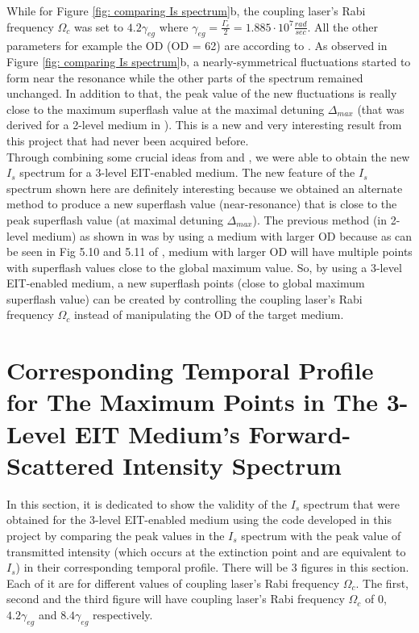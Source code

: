 While for Figure \ref{fig: comparing Is spectrum}b, the coupling laser's Rabi frequency $\Omega_{c}$ was set to $4.2\gamma_{eg}$ where $\gamma_{eg} = \frac{\Gamma_{e}}{2} = 1.885 \cdot 10^{7} \frac{rad}{sec}$. All the other parameters for example the OD (OD = 62) are according to \cite{jeong2010slow}. As observed in Figure \ref{fig: comparing Is spectrum}b, a nearly-symmetrical fluctuations started to form near the resonance while the other parts of the spectrum remained unchanged. In addition to that, the peak value of the new fluctuations is really close to the maximum superflash value at the maximal detuning $\Delta_{max}$ (that was derived for a 2-level medium in \cite{Kwong2017}). This is a new and very interesting result from this project that had never been acquired before.\\

Through combining some crucial ideas from \cite{Kwong2014} and \cite{jeong2010slow}, we were able to obtain the new $I_{s}$ spectrum for a 3-level EIT-enabled medium. The new feature of the $I_{s}$ spectrum shown here are definitely interesting because we obtained an alternate method to produce a new superflash value (near-resonance) that is close to the peak superflash value (at maximal detuning $\Delta_{max}$). The previous method (in 2-level medium) as shown in \cite{Kwong2017} was by using a medium with larger OD because as can be seen in Fig 5.10 and 5.11 of \cite{Kwong2017}, medium with larger OD will have multiple points with superflash values close to the global maximum value. So, by using a 3-level EIT-enabled medium, a new superflash points (close to global maximum superflash value) can be created by controlling the coupling laser's Rabi frequency $\Omega_{c}$ instead of manipulating the OD of the target medium.


\section{Corresponding Temporal Profile for The Maximum Points in The 3-Level EIT Medium's Forward-Scattered Intensity Spectrum}

In this section, it is dedicated to show the validity of the $I_{s}$ spectrum that were obtained for the 3-level EIT-enabled medium using the code developed in this project by comparing the peak values in the $I_{s}$ spectrum with the peak value of transmitted intensity (which occurs at the extinction point and are equivalent to $I_{s}$) in their corresponding temporal profile. There will be 3 figures in this section. Each of it are for different values of coupling laser's Rabi frequency $\Omega_{c}$. The first, second and the third figure will have coupling laser's Rabi frequency $\Omega_{c}$ of $0$, $4.2\gamma_{eg}$ and $8.4\gamma_{eg}$ respectively.

